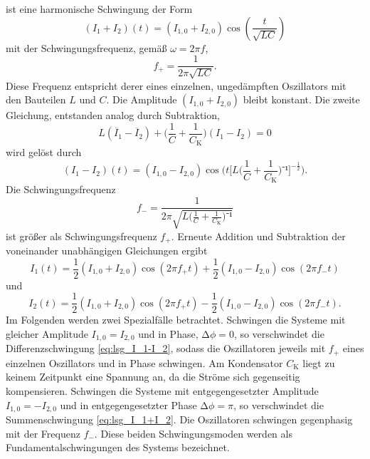ist eine harmonische Schwingung der Form
\begin{equation}
	({I_1}+{I_2})(t)=({I_{1,0}}+{I_{2,0}})\cos(\frac{t}{\sqrt{LC}})
\label{eq:lsg_I_1+I_2}
\end{equation}
mit der Schwingungsfrequenz, gemäß $\omega=2\pi f$,
\begin{equation}
f_+=\frac{1}{2\pi\sqrt{LC}}.
\label{eq:f_+}
\end{equation}
Diese Frequenz entspricht derer eines einzelnen, ungedämpften Oszillators mit den Bauteilen $L$ und $C$.
 Die Amplitude $(I_{1,0}+I_{2,0})$ bleibt konstant.
Die zweite Gleichung, entstanden analog durch Subtraktion,
\begin{equation}
	L(\ddot{I_1}-\ddot{I_2})+\bigl(\frac{1}{C}+\frac{1}{C_\mathup{K}}\bigr)({I_1}-{I_2})=0
	\label{eq:I_1-I_2}
\end{equation}
wird gelöst durch
\begin{equation}
	({I_1}-{I_2})(t)=({I_{1,0}}-{I_{2,0}})\cos\biggl(t{\biggl[L\biggl({\frac{1}{C}+\frac{1}{C_\mathup{K}}}\biggr)⁻¹\biggr]^{-\frac{1}{2}}}\biggr).
\label{eq:lsg_I_1-I_2}
\end{equation}
Die Schwingungsfrequenz 
\begin{equation}
f_-=\frac{1}{2\pi\sqrt{L\bigl({\frac{1}{C}+\frac{1}{C_\mathup{K}}}\bigr)⁻¹}}
\label{eq:f_-}
\end{equation}
 ist größer als Schwingungsfrequenz $f_+$.
Erneute Addition und Subtraktion der voneinander unabhängigen Gleichungen ergibt
\begin{equation}
	I_1(t)=\frac{1}{2}({I_{1,0}}+{I_{2,0}})\cos(2\pi f_+t)+\frac{1}{2}({I_{1,0}}-{I_{2,0}})\cos(2\pi f_-t)
	\label{eq:I_1_ur}
\end{equation}
und
\begin{equation}
	I_2(t)=\frac{1}{2}({I_{1,0}}+{I_{2,0}})\cos(2\pi f_+ t)-\frac{1}{2}({I_{1,0}}-{I_{2,0}})\cos(2\pi f_- t).
	\label{eq:I_2_ur}
\end{equation}
Im Folgenden werden zwei Spezialfälle betrachtet. 
Schwingen die Systeme mit gleicher Amplitude $I_{1,0}=I_{2,0}$ und in Phase, $\mathup{\Delta} \phi=0$, so verschwindet die Differenzschwingung \eqref{eq:lsg_I_1-I_2}, sodass die Oszillatoren jeweils mit $f_+$ eines einzelnen Oszillators und in Phase schwingen.
Am Kondensator $C_\mathup{K}$ liegt zu keinem Zeitpunkt eine Spannung an, da die Ströme sich gegenseitig kompensieren.
Schwingen die Systeme mit entgegengesetzter Amplitude  $I_{1,0}=-I_{2,0}$ und in entgegengesetzter Phase $\mathup{\Delta} \phi=\pi$, so verschwindet die Summenschwingung \eqref{eq:lsg_I_1+I_2}. 
Die Oszillatoren schwingen gegenphasig mit der Frequenz $f_-$.
Diese beiden Schwingungsmoden werden als Fundamentalschwingungen des Systems bezeichnet.

